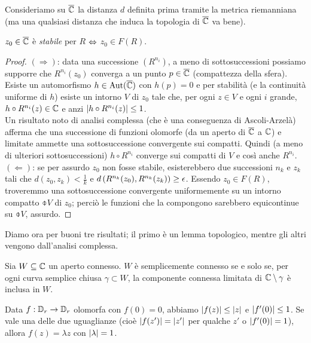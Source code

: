 Consideriamo su $\overline{\mathbb{C}}$ la distanza $d$ definita prima tramite la metrica riemanniana
(ma una qualsiasi distanza che induca la topologia di $\overline{\mathbb{C}}$ va bene).

\begin{prop}$z_0\in\overline{\mathbb{C}}$ è \emph{stabile} per $R$ $\Leftrightarrow$ $z_0\in F(R)$.
\end{prop}

\begin{proof}$(\Rightarrow)$: data una successione $(R^{n_i})$, a meno di sottosuccessioni possiamo supporre che
$R^{n_i}(z_0)$ converga a un punto $p\in\overline{\mathbb{C}}$ (compattezza della sfera). Esiste un automorfismo $h\in\operatorname{Aut}(\overline{\mathbb{C}})$
con $h(p)=0$ e per stabilità (e la continuità uniforme di $h$) esiste un intorno $V$ di $z_0$ tale che,
per ogni $z\in V$ e ogni $i$ grande, $h\circ R^{n_i}(z)\in\mathbb{C}$ e anzi $\left|h\circ R^{n_i}(z)\right|\le 1$. \\
Un risultato noto di analisi complessa (che è una conseguenza di Ascoli-Arzelà) afferma che una successione di funzioni olomorfe
(da un aperto di $\overline{\mathbb{C}}$ a $\mathbb{C}$) e limitate ammette una sottosuccessione convergente sui compatti.
Quindi (a meno di ulteriori sottosuccessioni) $h\circ R^{n_i}$ converge sui compatti di $V$ e così anche $R^{n_i}$. \\
$(\Leftarrow)$: se per assurdo $z_0$ non fosse stabile, esisterebbero due successioni $n_k$ e $z_k$ tali che
$d(z_0,z_k)<\frac{1}{k}$ e $d\left(R^{n_k}(z_0),R^{n_k}(z_k)\right)\ge\epsilon$.
Essendo $z_0\in F(R)$, troveremmo una sottosuccessione convergente uniformemente su un intorno compatto $\obar{V}$ di $z_0$;
perciò le funzioni che la compongono sarebbero equicontinue su $\obar{V}$, assurdo.
\end{proof}

Diamo ora per buoni tre risultati; il primo è un lemma topologico, mentre gli altri vengono dall'analisi complessa.

\begin{lemma}Sia $W\subseteq\mathbb{C}$ un aperto connesso. $W$ è semplicemente connesso se e solo se,
per ogni curva semplice chiusa $\gamma\subset W$, la componente connessa limitata di $\mathbb{C}\setminus\gamma$ è inclusa in $W$.
\end{lemma}

\begin{lemma}[Schwarz]Data $f:\mathbb{D}_r\to\mathbb{D}_r$ olomorfa con $f(0)=0$, abbiamo $\left|f(z)\right|\le\left|z\right|$
e $\left|f'(0)\right|\le 1$. Se vale una delle due uguaglianze (cioè $\left|f(z')\right|=\left|z'\right|$ per qualche $z'$ o $\left|f'(0)\right|=1$),
allora $f(z)=\lambda z$ con $\left|\lambda\right|=1$.
\end{lemma}

